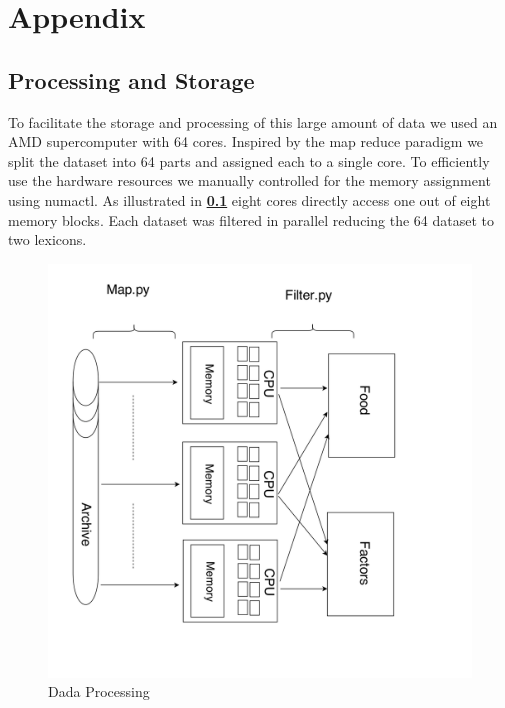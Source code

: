 \documentclass[12pt]{report}
\begin{document}
%
%

\cleardoublepage
{}
{}






\cleardoublepage
{}
\chapter*{Appendix}

\section{Processing and Storage}

 To facilitate the storage and processing of this large amount of data we used an AMD supercomputer with 64 cores. Inspired by the  map reduce paradigm we split the dataset into 64 parts and assigned each to a single core. To efficiently use the hardware resources we manually controlled for the memory assignment using numactl. As illustrated in\textbf{ \ref{fig:dataProcessing}} eight cores directly access one out of eight memory blocks. Each dataset was filtered in parallel reducing the 64 dataset to two lexicons. 

 \begin{figure}[H]
\centerline{ \noindent\includegraphics[width=1\textwidth]{img/abs/hw_model}}
 \caption{Dada Processing}
 \label{fig:dataProcessing}
\end{figure}
\end{document}
